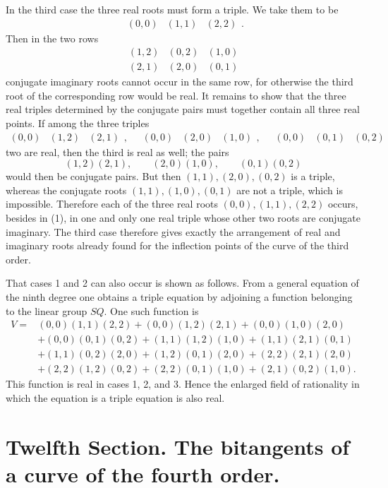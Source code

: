 \documentclass[11pt]{article}
\providecommand{\trip}[3]{\begin{array}{ccc}#1&#2&#3\end{array}}
\providecommand{\trip}[3]{\begin{array}{ccc}#1&#2&#3\end{array}}
\begin{document}
In the third case the three real roots must form a triple. We take them to be
\begin{equation}
 \trip{(0,0)}{(1,1)}{(2,2)}.
 \tag{1}
\end{equation}
Then in the two rows
\begin{equation}
\begin{array}{ccc}
(1,2)&(0,2)&(1,0)\\
(2,1)&(2,0)&(0,1)
\end{array}
\tag{2}
\end{equation}
conjugate imaginary roots cannot occur in the same row, for otherwise the third root of the corresponding row would be real. It remains to show that the three real triples determined by the conjugate pairs must together contain all three real points. If among the three triples
\[
\trip{(0,0)}{(1,2)}{(2,1)},
\quad
\trip{(0,0)}{(2,0)}{(1,0)},
\quad
\trip{(0,0)}{(0,1)}{(0,2)}
\]
two are real, then the third is real as well; the pairs
\[
(1,2)(2,1),
\qquad
(2,0)(1,0),
\qquad
(0,1)(0,2)
\]
would then be conjugate pairs. But then \((1,1),(2,0),(0,2)\) is a triple, whereas the conjugate roots \((1,1),(1,0),(0,1)\) are not a triple, which is impossible. Therefore each of the three real roots \((0,0),(1,1),(2,2)\) occurs, besides in (1), in one and only one real triple whose other two roots are conjugate imaginary. The third case therefore gives exactly the arrangement of real and imaginary roots already found for the inflection points of the curve of the third order.

That cases 1 and 2 can also occur is shown as follows. From a general equation of the ninth degree one obtains a triple equation by adjoining a function belonging to the linear group \(SQ\). One such function is
\begin{align*}
 V={}&(0,0)(1,1)(2,2)+(0,0)(1,2)(2,1)+(0,0)(1,0)(2,0)\\
 &+(0,0)(0,1)(0,2)+(1,1)(1,2)(1,0)+(1,1)(2,1)(0,1)\\
 &+(1,1)(0,2)(2,0)+(1,2)(0,1)(2,0)+(2,2)(2,1)(2,0)\\
 &+(2,2)(1,2)(0,2)+(2,2)(0,1)(1,0)+(2,1)(0,2)(1,0).
\end{align*}
This function is real in cases 1, 2, and 3. Hence the enlarged field of rationality in which the equation is a triple equation is also real.





\section*{Twelfth Section. The bitangents of a curve of the fourth order.}
\end{document}
